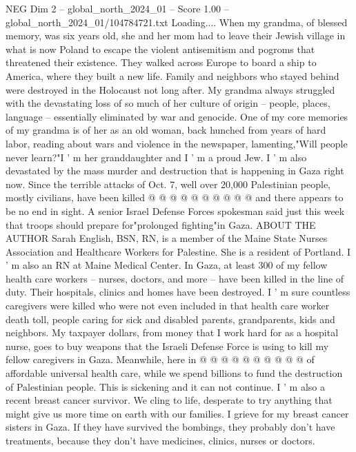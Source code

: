 \begin{textsample}{NEG Dim 2 – global\_north\_2024\_01 – Score 1.00 – global\_north\_2024\_01/104784721.txt}  \label{ex:f2_neg_338}
Loading....
When my grandma, of blessed memory, was six years old, she and her mom had to leave their Jewish village in what is now Poland to escape the violent antisemitism and pogroms that threatened their existence.
They walked across Europe to board a ship to America, where they built a new life.
Family and neighbors who stayed behind were destroyed in the Holocaust not long after.
My grandma always struggled with the devastating loss of so much of her culture of origin -- people, places, language -- essentially eliminated by war and genocide.
One of my core memories of my grandma is of her as an old woman, back hunched from years of hard labor, reading about wars and violence in the newspaper, lamenting,"Will people never learn?"I ' m her granddaughter and I ' m a proud Jew.
I ' m also devastated by the mass murder and destruction that is happening in Gaza right now.
Since the terrible attacks of Oct. 7, well over 20,000 Palestinian people, mostly civilians, have been killed @ @ @ @ @ @ @ @ @ @ and there appears to be no end in sight.
A senior Israel Defense Forces spokesman said just this week that troops should prepare for"prolonged fighting"in Gaza.
ABOUT THE AUTHOR Sarah English, BSN, RN, is a member of the Maine State Nurses Association and Healthcare Workers for Palestine.
She is a resident of Portland.
I ' m also an RN at Maine Medical Center.
In Gaza, at least 300 of my fellow health care workers -- nurses, doctors, and more -- have been killed in the line of duty.
Their hospitals, clinics and homes have been destroyed.
I ' m sure countless caregivers were killed who were not even included in that health care worker death toll, people caring for sick and disabled parents, grandparents, kids and neighbors.
My taxpayer dollars, from money that I work hard for as a hospital nurse, goes to buy weapons that the Israeli Defense Force is using to kill my fellow caregivers in Gaza.
Meanwhile, here in @ @ @ @ @ @ @ @ @ @ of affordable universal health care, while we spend billions to fund the destruction of Palestinian people.
This is sickening and it can not continue.
I ' m also a recent breast cancer survivor.
We cling to life, desperate to try anything that might give us more time on earth with our families.
I grieve for my breast cancer sisters in Gaza.
If they have survived the bombings, they probably don't have treatments, because they don't have medicines, clinics, nurses or doctors.

\end{textsample}
